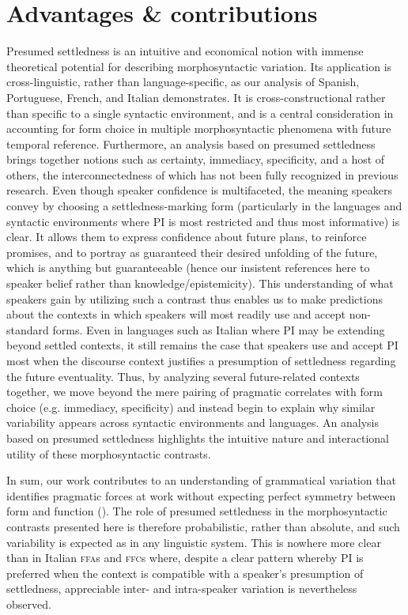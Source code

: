 \documentclass[output=paper,colorlinks,citecolor=brown]{langscibook}
\begin{document}
\section{Advantages \& contributions}\label{sec:hoff:Advantages}

Presumed settledness is an intuitive and economical notion with immense theoretical potential for describing morphosyntactic variation. Its application is cross-linguistic, rather than language-specific, as our analysis of Spanish, Portuguese, French, and Italian demonstrates. It is cross-constructional rather than specific to a single syntactic environment, and is a central consideration in accounting for form choice in multiple morphosyntactic phenomena with future temporal reference. Furthermore, an analysis based on presumed settledness brings together notions such as certainty, immediacy, specificity, and a host of others, the interconnectedness of which has not been fully recognized in previous research. Even though speaker confidence is multifaceted, the meaning speakers convey by choosing a settledness-marking form (particularly in the languages and syntactic environments where PI is most restricted and thus most informative) is clear. It allows them to express confidence about future plans, to reinforce promises, and to portray as guaranteed their desired unfolding of the future, which is anything but guaranteeable (hence our insistent references here to speaker belief rather than knowledge/epistemicity). This understanding of what speakers gain by utilizing such a contrast thus enables us to make predictions about the contexts in which speakers will most readily use and accept non-standard forms. Even in languages such as Italian where PI may be extending beyond settled contexts, it still remains the case that speakers use and accept PI most when the discourse context justifies a presumption of settledness regarding the future eventuality. Thus, by analyzing several future-related contexts together, we move beyond the mere pairing of pragmatic correlates with form choice (e.g. immediacy, specificity) and instead begin to explain why similar variability appears across syntactic environments and languages. An analysis based on presumed settledness highlights the intuitive nature and interactional utility of these morphosyntactic contrasts.
 
In sum, our work contributes to an understanding of grammatical variation that identifies pragmatic forces at work without expecting perfect symmetry between form and function (\citealt{PoplackDion2009}). The role of presumed settledness in the morphosyntactic contrasts presented here is therefore probabilistic, rather than absolute, and such variability is expected as in any linguistic system. This is nowhere more clear than in Italian \textsc{ffa}s and \textsc{ffc}s where, despite a clear pattern whereby PI is preferred when the context is compatible with a speaker’s presumption of settledness, appreciable inter- and intra-speaker variation is nevertheless observed.
\end{document}
